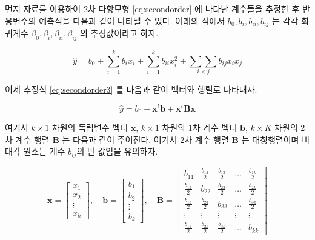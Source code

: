 \documentclass[
]{book}
\newcommand{\bm}[1]{\boldsymbol{\mathbf{#1}}}
\theoremstyle{definition}
\theoremstyle{definition}
\theoremstyle{definition}
\theoremstyle{definition}
\theoremstyle{remark}
\begin{document}
먼저 자료를 이용하여 2차 다항모형 \eqref{eq:secondorder} 에 나타난 계수들을 추정한 후 반응변수의 예측식을 다음과 같이 나타낼 수 있다. 아래의 식에서 \(b_0,b_{i}, b_{ii}, b_{ij}\) 는 각각 회귀계수 \(\beta_0, \beta_{i}, \beta_{ii}, \beta_{ij}\) 의 추정값이라고 하자.

\begin{equation}
\hat y = b_0 + \sum_{i=1}^{k} b_i x_i + \sum_{i=1}^{k} b_{ii} x^2_i + \underset{i<j}{\sum \sum} b_{ij} x_i x_j
\label{eq:secondorder3}
\end{equation}

이제 추정식 \eqref{eq:secondorder3} 를 다음과 같이 벡터와 행렬로 나타내자.

\begin{equation}
\hat y = b_0 + {\bm x}^t \bm b + {\bm x}^t \bm B {\bm x} 
\label{eq:secondordermat}
\end{equation}

여기서 \(k \times 1\) 차원의 독립변수 벡터 \(\bm x\), \(k \times 1\) 차원의 1차 계수 벡터 \(\bm b\), \(k \times K\) 차원의 2차 계수 행렬 \(\bm B\) 는 다음과 같이 주어진다. 여기서 2차 계수 행렬 \(\bm B\) 는 대칭행렬이며 비대각 원소는 계수 \(b_{ij}\)의 반 값임을 유의하자.

\begin{equation}
\bm x = 
\begin{bmatrix}
x_1 \\
x_2 \\
\vdots \\
x_k
\end{bmatrix}
, \quad
\bm b = 
\begin{bmatrix}
b_1 \\
b_2 \\
\vdots \\
b_k
\end{bmatrix}, \quad
\bm B =
\begin{bmatrix}
b_{11}   & \frac{b_{12}}{2} & \frac{b_{13}}{2}    & \dots & \frac{b_{1k}}{2} \\
\frac{b_{12}}{2} & b_{22}   & \frac{b_{23}}{2}  & \dots & \frac{b_{2k}}{2}  \\
\frac{b_{13}}{2}  & \frac{b_{23}}{2}    & b_{33} & \dots & \frac{b_{3k}}{2} \\
\vdots   & \vdots   & \vdots   & \vdots & \vdots \\
\frac{b_{1k}}{2}  & \frac{b_{2k}}{2}    & \frac{b_{3k}}{2}  & \dots & b_{kk} 
\end{bmatrix}
\label{eq:coef}
\end{equation}
\end{document}
